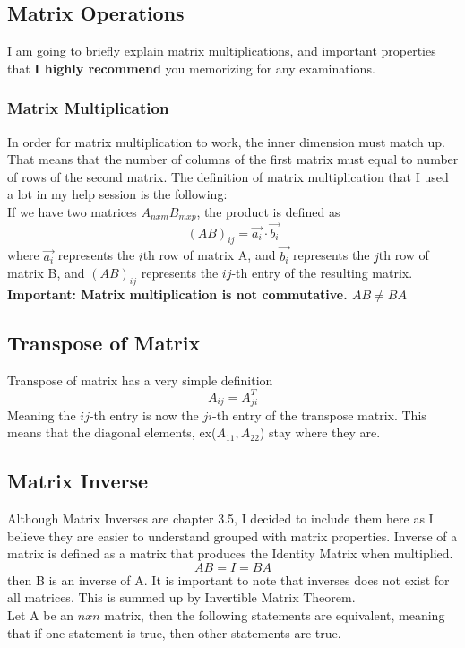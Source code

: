 \documentclass[12pt]{article}
\begin{document}
\subsection{Matrix Operations}
I am going to briefly explain matrix multiplications, and important properties that \textbf{I highly recommend} you memorizing for any examinations. 
\subsubsection{Matrix Multiplication}
In order for matrix multiplication to work, the inner dimension must match up. That means that the number of columns of the first matrix must equal to number of rows of the second matrix. 
The definition of matrix multiplication that I used a lot in my help session is the following:\\
If we have two matrices $A_{nxm}B_{mxp}$, the product is defined as
\begin{equation}
(AB)_{ij}  = \vec{a_i} \cdot \vec{b_i} 
\end{equation}
where $\vec{a_i}$ represents the $i$th row of matrix A, and $\vec{b_i}$ represents the $j$th row of matrix B, and $(AB)_{ij}$ represents the $ij$-th entry of the resulting matrix. \\
\textbf{Important: Matrix multiplication is not commutative. $AB \neq BA$}

\subsection{Transpose of Matrix}
Transpose of matrix has a very simple definition
\begin{equation}
A_{ij} = A^{T}_{ji}
\end{equation}
Meaning the $ij$-th entry is now the $ji$-th entry of the transpose matrix. This means that the diagonal elements, ex($A_{11}, A_{22}$) stay where they are.

\subsection{Matrix Inverse}
Although Matrix Inverses are chapter 3.5, I decided to include them here as I believe they are easier to understand grouped with matrix properties. Inverse of a matrix is defined as a matrix that produces the Identity Matrix when multiplied. 
\begin{equation}
AB = I = BA
\end{equation}
then B is an inverse of A.
It is important to note that inverses does not exist for all matrices. This is summed up by Invertible Matrix Theorem.\\
Let A be an $nxn$ matrix, then the following statements are equivalent, meaning that if one statement is true, then other statements are true.
\end{document}
